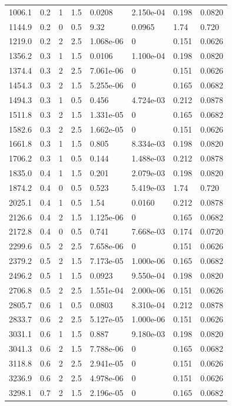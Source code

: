 \documentclass[preview]{standalone}
\begin{document}
{{\begin{tabular}{L{1.2cm}C{1.2cm} C{0.3cm}C{0.5cm} C{1.4cm}C{1.4cm} C{1.4cm}C{1.4cm}}
  1006.1  &   0.2  & 1     & 1.5 &  0.0208  & 2.150e-04  & 0.198 &  0.0820   \\ 
  1144.9  &   0.2  & 0     & 0.5 &  9.32  & 0.0965  & 1.74 &  0.720   \\ 
  1219.0  &   0.2  & 2     & 2.5 &  1.068e-06  & 0  & 0.151 &  0.0626   \\ 
  1356.2  &   0.3  & 1     & 1.5 &  0.0106  & 1.100e-04  & 0.198 &  0.0820   \\ 
  1374.4  &   0.3  & 2     & 2.5 &  7.061e-06  & 0  & 0.151 &  0.0626   \\ 
  1454.3  &   0.3  & 2     & 1.5 &  5.255e-06  & 0  & 0.165 &  0.0682   \\ 
  1494.3  &   0.3  & 1     & 0.5 &  0.456  & 4.724e-03  & 0.212 &  0.0878   \\ 
  1511.8  &   0.3  & 2     & 1.5 &  1.331e-05  & 0  & 0.165 &  0.0682   \\ 
  1582.6  &   0.3  & 2     & 2.5 &  1.662e-05  & 0  & 0.151 &  0.0626   \\ 
  1661.8  &   0.3  & 1     & 1.5 &  0.805  & 8.334e-03  & 0.198 &  0.0820   \\ 
  1706.2  &   0.3  & 1     & 0.5 &  0.144  & 1.488e-03  & 0.212 &  0.0878   \\ 
  1835.0  &   0.4  & 1     & 1.5 &  0.201  & 2.079e-03  & 0.198 &  0.0820   \\ 
  1874.2  &   0.4  & 0     & 0.5 &  0.523  & 5.419e-03  & 1.74 &  0.720   \\ 
  2025.1  &   0.4  & 1     & 0.5 &  1.54  & 0.0160  & 0.212 &  0.0878   \\ 
  2126.6  &   0.4  & 2     & 1.5 &  1.125e-06  & 0  & 0.165 &  0.0682   \\ 
  2172.8  &   0.4  & 0     & 0.5 &  0.741  & 7.668e-03  & 0.174 &  0.0720   \\ 
  2299.6  &   0.5  & 2     & 2.5 &  7.658e-06  & 0  & 0.151 &  0.0626   \\ 
  2379.2  &   0.5  & 2     & 1.5 &  7.173e-05  & 1.000e-06  & 0.165 &  0.0682   \\ 
  2496.2  &   0.5  & 1     & 1.5 &  0.0923  & 9.550e-04  & 0.198 &  0.0820   \\ 
  2706.8  &   0.5  & 2     & 2.5 &  1.551e-04  & 2.000e-06  & 0.151 &  0.0626   \\ 
  2805.7  &   0.6  & 1     & 0.5 &  0.0803  & 8.310e-04  & 0.212 &  0.0878   \\ 
  2833.7  &   0.6  & 2     & 2.5 &  5.127e-05  & 1.000e-06  & 0.151 &  0.0626   \\ 
  3031.1  &   0.6  & 1     & 1.5 &  0.887  & 9.180e-03  & 0.198 &  0.0820   \\ 
  3041.3  &   0.6  & 2     & 1.5 &  7.788e-06  & 0  & 0.165 &  0.0682   \\ 
  3118.8  &   0.6  & 2     & 2.5 &  2.941e-05  & 0  & 0.151 &  0.0626   \\ 
  3236.9  &   0.6  & 2     & 2.5 &  4.978e-06  & 0  & 0.151 &  0.0626   \\ 
  3298.1  &   0.7  & 2     & 1.5 &  2.196e-05  & 0  & 0.165 &  0.0682   \\ 
\hline 
\end{tabular} 

}}
\end{document}
